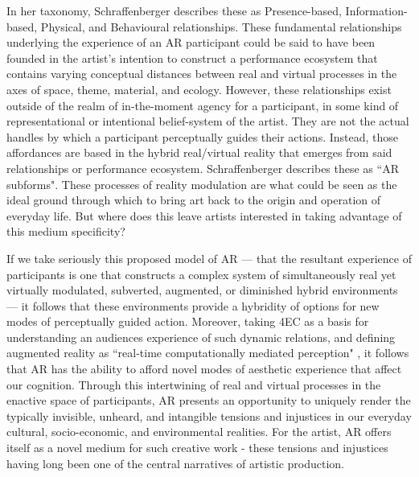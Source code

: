In her taxonomy, Schraffenberger describes these as Presence-based, Information-based, Physical, and Behavioural relationships. These fundamental relationships underlying the experience of an AR participant could be said to have been founded in the artist's intention to construct a performance ecosystem that contains varying conceptual distances between real and virtual processes in the axes of space, theme, material, and ecology. However, these relationships exist outside of the realm of in-the-moment agency for a participant, in some kind of representational or intentional belief-system of the artist. They are not the actual handles by which a participant perceptually guides their actions. Instead, those affordances are based in the hybrid real/virtual reality that emerges from said relationships or performance ecosystem. Schraffenberger describes these as ``AR subforms". These processes of reality modulation are what could be seen as the ideal ground through which to bring art back to the origin and operation of everyday life. But where does this leave artists interested in taking advantage of this medium specificity? 

If we take seriously this proposed model of AR — that the resultant experience of participants is one that constructs a complex system of simultaneously real yet virtually modulated, subverted, augmented, or diminished hybrid environments — it follows that these environments provide a hybridity of options for new modes of perceptually guided action. Moreover, taking 4EC as a basis for understanding an audiences experience of such dynamic relations, and defining augmented reality as ``real-time computationally mediated perception" \citep[]{chevalier2020}, it follows that AR has the ability to afford novel modes of aesthetic experience that affect our cognition. Through this intertwining of real and virtual processes in the enactive space of participants, AR presents an opportunity to uniquely render the typically invisible, unheard, and intangible tensions and injustices in our everyday cultural, socio-economic, and environmental realities. For the artist, AR offers itself as a novel medium for such creative work - these tensions and injustices having long been one of the central narratives of artistic production.
